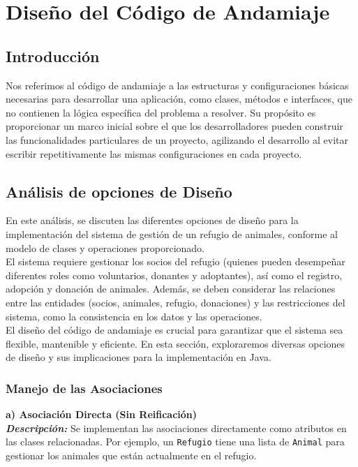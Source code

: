 \section{Diseño del Código de Andamiaje}

\subsection{Introducción}
Nos referimos al código de andamiaje a las estructuras y configuraciones básicas necesarias para desarrollar una aplicación, como clases, métodos e interfaces, que no contienen la lógica específica del problema a resolver. Su propósito es proporcionar un marco inicial sobre el que los desarrolladores pueden construir las funcionalidades particulares de un proyecto, agilizando el desarrollo al evitar escribir repetitivamente las mismas configuraciones en cada proyecto.

\subsection{Análisis de opciones de Diseño}
En este análisis, se discuten las diferentes opciones de diseño para la implementación del sistema de gestión de un refugio de animales, conforme al modelo de clases y operaciones proporcionado.\\

El sistema requiere gestionar los socios del refugio (quienes pueden desempeñar diferentes roles como voluntarios, donantes y adoptantes), así como el registro, adopción y donación de animales. Además, se deben considerar las relaciones entre las entidades (socios, animales, refugio, donaciones) y las restricciones del sistema, como la consistencia en los datos y las operaciones.\\

El diseño del código de andamiaje es crucial para garantizar que el sistema sea flexible, mantenible y eficiente. En esta sección, exploraremos diversas opciones de diseño y sus implicaciones para la implementación en Java.

\subsubsection{Manejo de las Asociaciones}

\textbf{a) Asociación Directa (Sin Reificación)}\\

\textit{\textbf{Descripción:}}  
Se implementan las asociaciones directamente como atributos en las clases relacionadas. Por ejemplo, un \texttt{Refugio} tiene una lista de \texttt{Animal} para gestionar los animales que están actualmente en el refugio.\\

